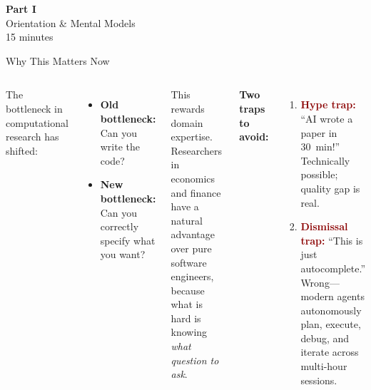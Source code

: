 \documentclass[aspectratio=169,10pt]{beamer}
\newcommand{\emphc}[1]{\textcolor{harvardcrimson}{#1}}
\begin{document}

\begin{frame}{}
\vfill
\begin{center}
{\Huge \textcolor{uzhblue}{\textbf{Part I}}}\\[12pt]
{\LARGE Orientation \& Mental Models}\\[6pt]
{\small 15 minutes}
\end{center}
\vfill
\end{frame}

\begin{frame}{Why This Matters Now}
\small
\begin{columns}[T]
The bottleneck in computational research has \emphc{shifted}:

\vspace{0.4em}
\begin{itemize}\itemsep2pt
    \item \textbf{Old bottleneck:} Can you write the code?
    \item \textbf{New bottleneck:} Can you correctly \emphc{specify what you want}?
\end{itemize}

\vspace{0.3em}
This rewards \emphc{domain expertise}. Researchers in economics and finance have a natural advantage over pure software engineers, because what is hard is knowing \emph{what question to ask}.

\vspace{0.4em}
\textbf{Two traps to avoid:}
\begin{enumerate}\itemsep1pt
    \item \textcolor{darkred}{\textbf{Hype trap:}} ``AI wrote a paper in 30~min!''\\
    {\small Technically possible; quality gap is real.}
    \item \textcolor{darkred}{\textbf{Dismissal trap:}} ``This is just autocomplete.''\\
    {\small Wrong---modern agents autonomously plan, execute, debug, and iterate across multi-hour sessions.}
\end{enumerate}


\end{columns}
\end{frame}
\end{document}
